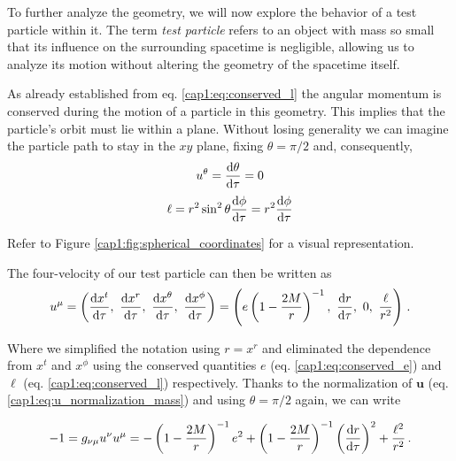 \begin{minipage}{0.57 \textwidth}
    To further analyze the \Sh geometry, we will now explore the behavior of a
    test particle within it.
    The term \textit{test particle} refers to an object with mass so small that
    its influence on the surrounding spacetime is negligible, allowing us to
    analyze its motion without altering the geometry of the spacetime itself.

    As already established from eq. \ref{cap1:eq:conserved_l} the angular
    momentum is conserved during the motion of a particle in this geometry.
    This implies that the particle's orbit must lie within a plane.
    Without losing generality we can imagine the particle path to stay in the
    $xy$ plane, fixing $\theta = \pi / 2$ and, consequently,
    \begin{equation*}
        u^\theta = \dv{\theta}{\tau} = 0 
    \end{equation*}
    \begin{equation*}
        \ell = r^2 \sin^2 \theta \dv{\phi}{\tau} = r^2 \dv{\phi}{\tau}
    \end{equation*}

    Refer to Figure \ref{cap1:fig:spherical_coordinates} for a visual
    representation.
\end{minipage}
\hspace{0.02 \textwidth}

The four-velocity of our test particle can then be written as
\begin{equation*}
    u^\mu
    = \left(\dv{x^t}{\tau},~\dv{x^r}{\tau},~\dv{x^\theta}{\tau},~
    \dv{x^\phi}{\tau} \right)
    = \left(e \left(1 - \frac{2M}{r}\right)^{-1},~\dv{r}{\tau},~0,~
    \frac{\ell}{r^2} \right) \, .
\end{equation*}

Where we simplified the notation using $r = x^r$ and eliminated
the dependence from $x^t$ and $x^\phi$ using the conserved quantities $e$ (eq.
\ref{cap1:eq:conserved_e}) and $\ell$ (eq. \ref{cap1:eq:conserved_l})
respectively.
Thanks to the normalization of $\mathbf u$ (eq.
\ref{cap1:eq:u_normalization_mass}) and using $\theta = \pi / 2$ again, we can
write

\begin{equation*}
    - 1 = g_{\nu \mu} u^\nu u^\mu =
    - \left(1 - \frac{2M}{r} \right)^{-1} e^2
    + \left(1 - \frac{2M}{r} \right)^{- 1} \left(\dv{r}{\tau} \right)^2
    + \frac{\ell^2}{r^2} \, .
\end{equation*}

